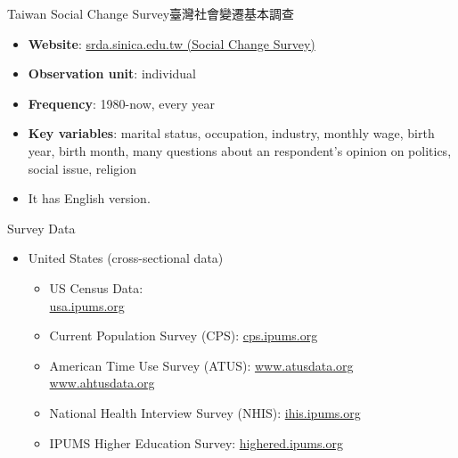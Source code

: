 \documentclass[hyperref={pdfpagelabels=false}]{beamer}
\begin{document}
\begin{frame}{Taiwan Social Change Survey}{臺灣社會變遷基本調查}
\begin{itemize} 
\item \textbf{Website}:  \href{https://srda.sinica.edu.tw/search/metadata/detail/C00390_1}{srda.sinica.edu.tw (Social Change Survey)}
\vspace{0.2cm}
\item \textbf{Observation unit}: individual
\vspace{0.2cm}
\item \textbf{Frequency}: 1980-now, every year 
\vspace{0.2cm}
\item \textbf{Key variables}: marital status, occupation, industry, monthly wage, birth year, birth month, many questions about an respondent's opinion on politics, social issue, religion
\vspace{0.2cm}
\item It has English version. 


\end{itemize}
\end{frame}






\begin{frame}{Survey Data}
\begin{itemize} 
\item United States (cross-sectional data)
\begin{itemize} 
\vspace{0.3cm}
\item US Census Data: \\ \href{https://usa.ipums.org/usa}{usa.ipums.org}
\vspace{0.3cm}
\item Current Population Survey (CPS): \href{https://cps.ipums.org/cps}{cps.ipums.org} 
\vspace{0.3cm}
\item American Time Use Survey (ATUS): \href{https://www.atusdata.org/atus}{www.atusdata.org}  \\  \href{https://www.ahtusdata.org/ahtus}{www.ahtusdata.org}
\vspace{0.3cm}
\item National Health Interview Survey (NHIS): \href{https://nhis.ipums.org/nhis/}{ihis.ipums.org}
\vspace{0.3cm}
\item IPUMS Higher Education Survey: \href{https://highered.ipums.org/highered}{highered.ipums.org}
\vspace{0.3cm} 
\end{itemize}

\end{itemize}
\end{frame}
\end{document}
